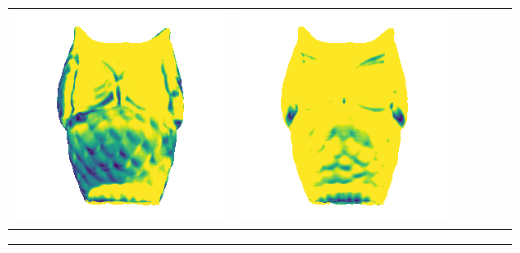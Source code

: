 \begin{center}
\begin{tabularx}{\linewidth}{@{}Y@{}Y@{}Y@{}Y@{}Y@{}Y@{}}
\includegraphics[width=\linewidth]{semisynthetic/20150514_15_marrnet_err.png} &
\includegraphics[width=\linewidth]{semisynthetic/20150514_15_ef_err.png} \\
\end{tabularx}
\begin{center}\rule{0.5\linewidth}{\linethickness}\end{center}


\end{center}
